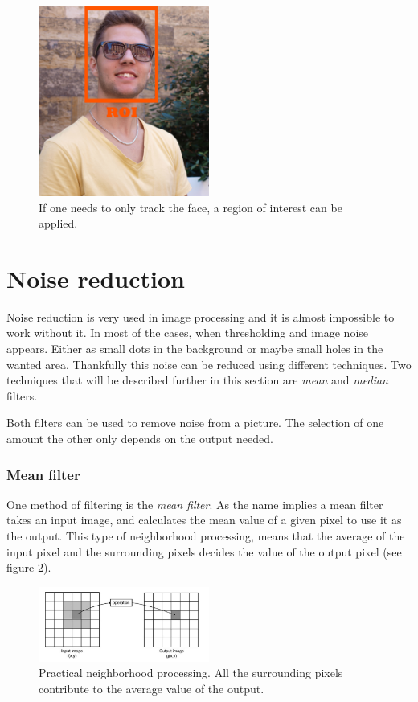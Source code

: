 {\begin{figure}[htbp] 
\centering 
\includegraphics[width=0.5\textwidth]{Pictures/Theory/RegionOfInterest.jpg} 
\caption{If one needs to only track the face, a region of interest can be applied.} 
\label{fig:Region of Interest} 
\end{figure} 

\section{Noise reduction}
Noise reduction is very used in image processing and it is almost impossible to work without it. In most of the cases, when thresholding and image noise appears. Either as small dots in the background or maybe small holes in the wanted area. Thankfully this noise can be reduced using different techniques. Two techniques that will be described further in this section are \textit{mean} and \textit{median} filters.

Both filters can be used to remove noise from a picture. The selection of one amount the other only depends on the output needed.

\subsubsection{Mean filter}
One method of filtering is the \textit{mean filter}. As the name implies a mean filter takes an input image, and calculates the mean value of a given pixel to use it as the output. This type of neighborhood processing, means that the average of the input pixel and the surrounding pixels decides the value of the output pixel (see figure \ref{fig:neigh_pros}).

\begin{figure}[htbp] 
\centering 
\includegraphics[width=0.5\textwidth]{Pictures/Theory/neighborhood_processing.png} 
\caption{Practical neighborhood processing. All the surrounding pixels contribute to the average value of the output.} 
\label{fig:neigh_pros} 
\end{figure}

}
